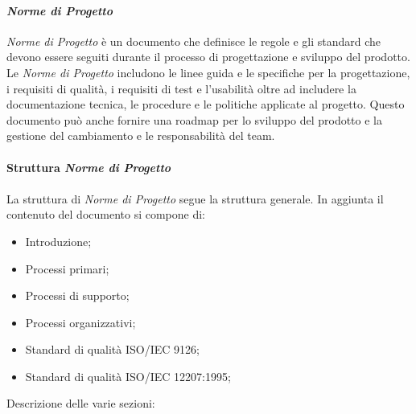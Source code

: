 \paragraph{\textit{Norme di Progetto}}
\textit{Norme di Progetto} è un documento che definisce le regole e gli standard che devono essere seguiti durante il processo di progettazione e 
sviluppo del prodotto. Le \textit{Norme di Progetto} includono le linee guida e le specifiche per la progettazione, i requisiti di qualità,
i requisiti di test e l'usabilità oltre ad includere la documentazione tecnica, le procedure 
e le politiche applicate al progetto. Questo documento può anche fornire una roadmap per lo sviluppo del prodotto e la gestione del cambiamento 
e le responsabilità del team.
\\\\
\textbf{Struttura \textit{Norme di Progetto}}
\\\\
La struttura di \textit{Norme di Progetto} segue la struttura generale.
In aggiunta il contenuto del documento si compone di:
\begin{itemize}
    \item Introduzione;
    \item Processi primari;
    \item Processi di supporto;
    \item Processi organizzativi;
    \item Standard di qualità ISO/IEC 9126;
    \item Standard di qualità ISO/IEC 12207:1995;
\end{itemize}
\noindent Descrizione delle varie sezioni:

